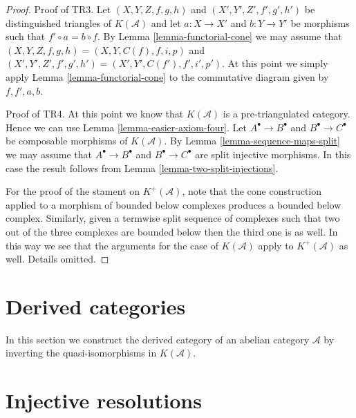 \begin{proof}
\medskip\noindent
Proof of TR3. Let
$(X, Y, Z, f, g, h)$ and $(X', Y', Z', f', g', h')$
be distinguished triangles of $K(\mathcal{A})$
and let $a : X \to X'$ and $b : Y \to Y'$ be morphisms
such that $f' \circ a = b \circ f$. By Lemma \ref{lemma-functorial-cone}
we may assume that
$(X, Y, Z, f, g, h) = (X, Y, C(f), f, i, p)$ and
$(X', Y', Z', f', g', h') = (X', Y', C(f'), f', i', p')$.
At this point we simply apply Lemma \ref{lemma-functorial-cone}
to the commutative diagram given by $f, f', a, b$.

\medskip\noindent
Proof of TR4. At this point we know that $K(\mathcal{A})$
is a pre-triangulated category. Hence we can use
Lemma \ref{lemma-easier-axiom-four}. Let $A^\bullet \to B^\bullet$
and $B^\bullet \to C^\bullet$ be composable morphisms of
$K(\mathcal{A})$. By Lemma \ref{lemma-sequence-maps-split} we may assume that
$A^\bullet \to B^\bullet$ and $B^\bullet \to C^\bullet$
are split injective morphisms. In this case the result follows
from Lemma \ref{lemma-two-split-injections}.

\medskip\noindent
For the proof of the stament on $K^{+}(\mathcal{A})$, note that
the cone construction applied to a morphism of bounded below
complexes produces a bounded below complex. Similarly, given a termwise
split sequence of complexes such that two out of the three complexes
are bounded below then the third one is as well. In this way
we see that the arguments for the case of $K(\mathcal{A})$ apply
to $K^{+}(\mathcal{A})$ as well. Details omitted.
\end{proof}







\section{Derived categories}
\label{section-derived-categories}

\noindent
In this section we construct the derived category of an abelian category
$\mathcal{A}$ by inverting the quasi-isomorphisms in $K(\mathcal{A})$.











\section{Injective resolutions}
\label{section-injective-resolutions}

